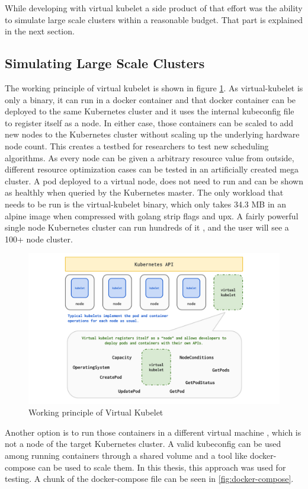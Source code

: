 While developing with virtual kubelet a side product of that effort was the ability to simulate large scale clusters within a reasonable budget. That part is explained in the next section.
\subsection{Simulating Large Scale Clusters}
The working principle of virtual kubelet is shown in figure \ref{fig:vk}. As virtual-kubelet is only a binary, it can run in a docker container and that docker container can be deployed to the same Kubernetes cluster and it uses the internal kubeconfig file to register itself as a node. In either case, those containers can be scaled to add new nodes to the Kubernetes cluster without scaling up the underlying hardware node count. This creates a testbed for researchers to test new scheduling algorithms. As every node can be given a arbitrary resource value from outside, different resource optimization cases can be tested in an artificially created mega cluster. A pod deployed to a virtual node, does not need to run and can be shown as healthly when queried by the Kubernetes master. The only workload that needs to be run is the virtual-kubelet binary, which only takes 34.3 MB in an alpine image when compressed with golang strip flags and upx. A fairly powerful single node Kubernetes cluster can run hundreds of it , and the user will see a 100+ node cluster.

\begin{figure}[htpb]
  \centering
  \includegraphics[width=1\textwidth]{figures/diagram.pdf}
  \caption{Working principle of Virtual Kubelet \cite{virtual}} \label{fig:vk}
\end{figure}

Another option is to run those containers in a different virtual machine , which is not a node of the target Kubernetes cluster. A valid kubeconfig can be used among running containers through a shared volume and a tool like docker-compose can be used to scale them. In this thesis, this approach was used for testing. A chunk of the docker-compose file can be seen in \ref{fig:docker-compose}.

